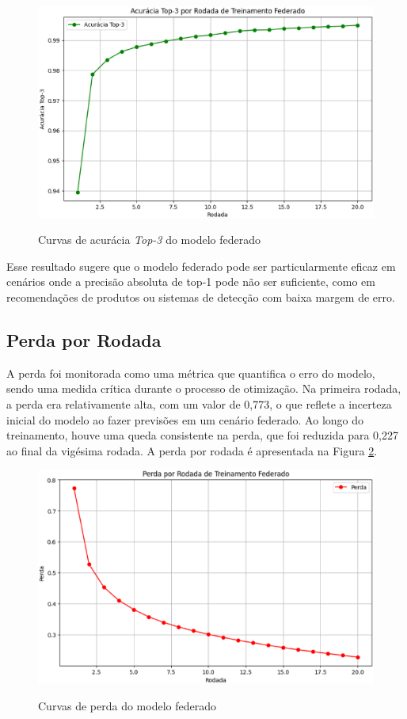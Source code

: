 \begin{figure}[ht]
    \centering
    \caption{Curvas de acurácia \textit{Top-3} do modelo federado}
    \includegraphics[scale=0.4]{figuras/analiseResultados/acuracyTop3Federated.eps}
    \label{fig:acuracyTop3Federated}
\end{figure}

Esse resultado sugere que o modelo federado pode ser particularmente eficaz em cenários onde a precisão absoluta de top-1 pode não ser suficiente, como em recomendações de produtos ou sistemas de detecção com baixa margem de erro.

\subsection{Perda por Rodada}

A perda foi monitorada como uma métrica que quantifica o erro do modelo, sendo uma medida crítica durante o processo de otimização. Na primeira rodada, a perda era relativamente alta, com um valor de 0,773, o que reflete a incerteza inicial do modelo ao fazer previsões em um cenário federado. Ao longo do treinamento, houve uma queda consistente na perda, que foi reduzida para 0,227 ao final da vigésima rodada. A perda por rodada é apresentada na Figura \ref{fig:lossFederated}.

\begin{figure}[ht]
    \centering
    \caption{Curvas de perda do modelo federado}
    \includegraphics[scale=0.4]{figuras/analiseResultados/lossFederated.eps}
    \label{fig:lossFederated}
\end{figure}

